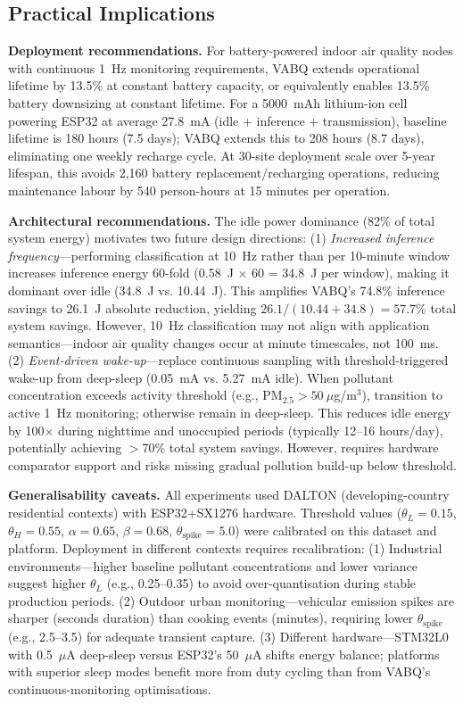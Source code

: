 \subsection{Practical Implications}

\textbf{Deployment recommendations.} For battery-powered indoor air quality nodes with continuous 1~Hz monitoring requirements, VABQ extends operational lifetime by 13.5\% at constant battery capacity, or equivalently enables 13.5\% battery downsizing at constant lifetime. For a 5000~mAh lithium-ion cell powering ESP32 at average 27.8~mA (idle + inference + transmission), baseline lifetime is 180 hours (7.5 days); VABQ extends this to 208 hours (8.7 days), eliminating one weekly recharge cycle. At 30-site deployment scale over 5-year lifespan, this avoids 2,160 battery replacement/recharging operations, reducing maintenance labour by 540 person-hours at 15 minutes per operation.

\textbf{Architectural recommendations.} The idle power dominance (82\% of total system energy) motivates two future design directions: (1) \emph{Increased inference frequency}---performing classification at 10~Hz rather than per 10-minute window increases inference energy 60-fold (0.58~J $\times$ 60 = 34.8~J per window), making it dominant over idle (34.8~J vs. 10.44~J). This amplifies VABQ's 74.8\% inference savings to 26.1~J absolute reduction, yielding $26.1 / (10.44 + 34.8) = 57.7$\% total system savings. However, 10~Hz classification may not align with application semantics---indoor air quality changes occur at minute timescales, not 100~ms. (2) \emph{Event-driven wake-up}---replace continuous sampling with threshold-triggered wake-up from deep-sleep (0.05~mA vs. 5.27~mA idle). When pollutant concentration exceeds activity threshold (e.g., PM$_{2.5} > 50~\mu$g/m$^3$), transition to active 1~Hz monitoring; otherwise remain in deep-sleep. This reduces idle energy by 100$\times$ during nighttime and unoccupied periods (typically 12--16 hours/day), potentially achieving $>$70\% total system savings. However, requires hardware comparator support and risks missing gradual pollution build-up below threshold.

\textbf{Generalisability caveats.} All experiments used DALTON (developing-country residential contexts) with ESP32+SX1276 hardware. Threshold values ($\theta_L = 0.15$, $\theta_H = 0.55$, $\alpha = 0.65$, $\beta = 0.68$, $\theta_{\text{spike}} = 5.0$) were calibrated on this dataset and platform. Deployment in different contexts requires recalibration: (1) Industrial environments---higher baseline pollutant concentrations and lower variance suggest higher $\theta_L$ (e.g., 0.25--0.35) to avoid over-quantisation during stable production periods. (2) Outdoor urban monitoring---vehicular emission spikes are sharper (seconds duration) than cooking events (minutes), requiring lower $\theta_{\text{spike}}$ (e.g., 2.5--3.5) for adequate transient capture. (3) Different hardware---STM32L0 with 0.5~$\mu$A deep-sleep versus ESP32's 50~$\mu$A shifts energy balance; platforms with superior sleep modes benefit more from duty cycling than from VABQ's continuous-monitoring optimisations.

